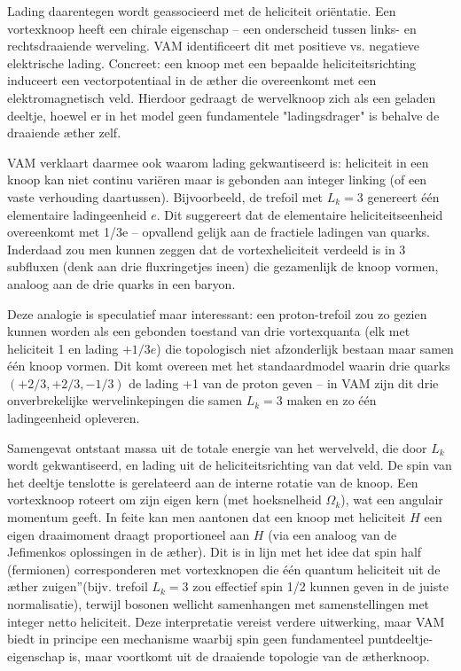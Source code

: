 Lading daarentegen wordt geassocieerd met de heliciteit oriëntatie. Een vortexknoop heeft een chirale eigenschap – een onderscheid tussen links- en rechtsdraaiende werveling. VAM identificeert dit met positieve vs. negatieve elektrische lading. Concreet: een knoop met een bepaalde heliciteitsrichting induceert een vectorpotentiaal in de æther die overeenkomt met een elektromagnetisch veld. Hierdoor gedraagt de wervelknoop zich als een geladen deeltje, hoewel er in het model geen fundamentele "ladingsdrager" is behalve de draaiende æther zelf.

VAM verklaart daarmee ook waarom lading gekwantiseerd is: heliciteit in een knoop kan niet continu variëren maar is gebonden aan integer linking (of een vaste verhouding daartussen). Bijvoorbeeld, de trefoil met $L_k=3$ genereert één elementaire ladingeenheid $e$. Dit suggereert dat de elementaire heliciteitseenheid overeenkomt met 1/3e – opvallend gelijk aan de fractiele ladingen van quarks. Inderdaad zou men kunnen zeggen dat de vortexheliciteit verdeeld is in 3 subfluxen (denk aan drie fluxringetjes ineen) die gezamenlijk de knoop vormen, analoog aan de drie quarks in een baryon.

Deze analogie is speculatief maar interessant: een proton-trefoil zou zo gezien kunnen worden als een gebonden toestand van drie vortexquanta (elk met heliciteit 1 en lading $+1/3e$) die topologisch niet afzonderlijk bestaan maar samen één knoop vormen. Dit komt overeen met het standaardmodel waarin drie quarks $(+2/3,+2/3,-1/3)$ de lading +1 van de proton geven – in VAM zijn dit drie onverbrekelijke wervelinkepingen die samen $L_k=3$ maken en zo één ladingeenheid opleveren.

Samengevat ontstaat massa uit de totale energie van het wervelveld, die door $L_k$ wordt gekwantiseerd, en lading uit de heliciteitsrichting van dat veld. De spin van het deeltje tenslotte is gerelateerd aan de interne rotatie van de knoop. Een vortexknoop roteert om zijn eigen kern (met hoeksnelheid $\Omega_k$), wat een angulair momentum geeft. In feite kan men aantonen dat een knoop met heliciteit $H$ een eigen draaimoment draagt proportioneel aan $H$ (via een analoog van de Jefimenko\rqs s oplossingen in de æther). Dit is in lijn met het idee dat spin half (fermionen) corresponderen met vortexknopen die één quantum heliciteit uit de æther \grqq zuigen\textquotedblright (bijv. trefoil $L_k=3$ zou effectief spin 1/2 kunnen geven in de juiste normalisatie), terwijl bosonen wellicht samenhangen met samenstellingen met integer netto heliciteit. Deze interpretatie vereist verdere uitwerking, maar VAM biedt in principe een mechanisme waarbij spin geen fundamenteel puntdeeltje-eigenschap is, maar voortkomt uit de draaiende topologie van de ætherknoop.